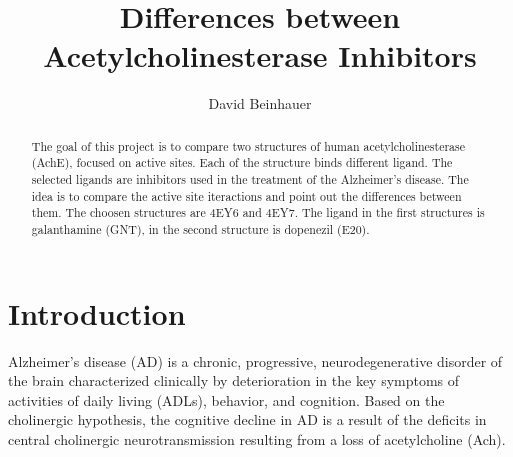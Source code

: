 \documentclass[10pt,a4paper,twocolumn]{article}
\begin{document}
\providecommand{\ShortAuthorList}[0]{David Beinhauer}
\title{Differences between Acetylcholinesterase Inhibitors}
\author[1,*]{David Beinhauer}

\date{\dateline{}}

\begin{abstract}
\noindent

The goal of this project is to compare two structures of human acetylcholinesterase
(AchE), focused on active sites. Each of the structure binds different ligand. 
The selected
ligands are inhibitors used in the treatment of the Alzheimer's disease. The idea is to
compare the active site iteractions and point out the differences between them. The
choosen structures are 4EY6 and 4EY7. The ligand in the first structures is 
galanthamine (GNT), in the second structure is dopenezil (E20). 


\DOI{} %
\end{abstract}

\maketitle
\thispagestyle{titlestyle}



\section*{Introduction}

Alzheimer's disease (AD) is a chronic, progressive, neurodegenerative disorder of the 
brain characterized clinically by deterioration in the key symptoms of activities 
of daily living (ADLs), behavior, and cognition. Based on the 
cholinergic hypothesis\textsuperscript{\cite{bartus1982cholinergic}},
the cognitive decline in AD is a result of the deficits in central cholinergic 
neurotransmission resulting from a loss of acetylcholine (Ach).
\end{document}
